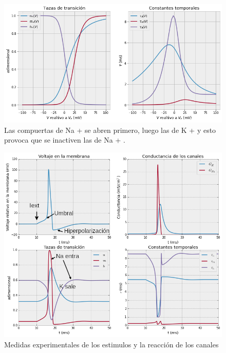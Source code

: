 \begin{figure}[H]
 \centering
 \includegraphics[scale=0.5]{../Figuras/actinac.png}
 \caption{Las compuertas de Na + se abren primero, luego las de K + y esto provoca que se inactiven las de Na + .}
 \label{fig:voltajeActInac}
\end{figure}

\begin{figure}[H]
 \centering
 \includegraphics[scale=0.5]{../Figuras/disparo.png}
 \caption{Medidas experimentales de los estimulos y la reacción de los canales}
 \label{fig:voltajeActInac}
\end{figure}


